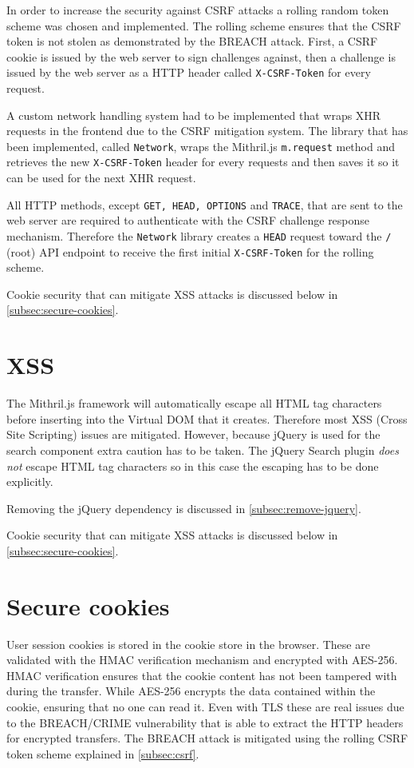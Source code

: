 \documentclass[12pt,a4paper]{report}
\begin{document}
In order to increase the security against CSRF attacks a rolling random token scheme was chosen and implemented. The rolling scheme ensures that the CSRF token is not stolen as demonstrated by the BREACH attack\cite{breach}. First, a CSRF cookie is issued by the web server to sign challenges against, then a challenge is issued by the web server as a HTTP header called \texttt{X-CSRF-Token} for every request.

A custom network handling system had to be implemented that wraps XHR requests in the frontend due to the CSRF mitigation system.  The library that has been implemented, called \texttt{Network}\cite{roaster-network}, wraps the Mithril.js \texttt{m.request} method and retrieves the new \texttt{X-CSRF-Token} header for every requests and then saves it so it can be used for the next XHR request.

All HTTP methods, except \texttt{GET, HEAD, OPTIONS} and \texttt{TRACE}, that are sent to the web server are required to authenticate with the CSRF challenge response mechanism. Therefore the \texttt{Network} library creates a \texttt{HEAD} request toward the \texttt{/} (root) API endpoint to receive the first initial \texttt{X-CSRF-Token} for the rolling scheme.

Cookie security that can mitigate XSS attacks is discussed below in \autoref{subsec:secure-cookies}.

\section{XSS}
The Mithril.js framework will automatically escape all HTML tag characters before inserting into the Virtual DOM that it creates\cite{mithril-trust}. Therefore most XSS (Cross Site Scripting) issues are mitigated. However, because jQuery is used for the search component extra caution has to be taken. The jQuery Search plugin \textit{does not} escape HTML tag characters so in this case the escaping has to be done explicitly.

Removing the jQuery dependency is discussed in \autoref{subsec:remove-jquery}.

Cookie security that can mitigate XSS attacks is discussed below in \autoref{subsec:secure-cookies}.

\section{Secure cookies}
\label{subsec:secure-cookies}
User session cookies is stored in the cookie store in the browser. These are validated with the HMAC verification mechanism and encrypted with AES-256. HMAC verification ensures that the cookie content has not been tampered with during the transfer\cite{fips-198}. While AES-256 encrypts the data contained within the cookie, ensuring that no one can read it\cite{fips-197}. Even with TLS these are real issues due to the BREACH/CRIME vulnerability that is able to extract the HTTP headers for encrypted transfers\cite{breach}. The BREACH attack is mitigated using the rolling CSRF token scheme explained in \autoref{subsec:csrf}.
\end{document}
